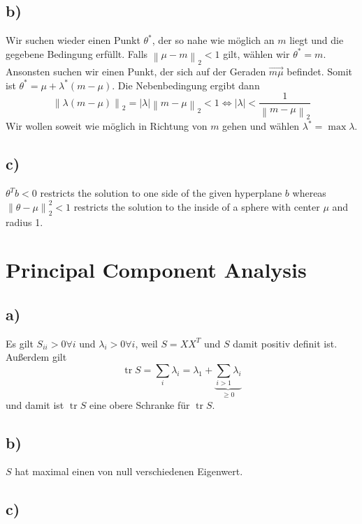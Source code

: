 \documentclass[paper=a4,fontsize=10pt,DIV11,BCOR10mm]{scrartcl}
\newcommand{\abs}[1]{\left\lvert#1\right\rvert}
\newcommand{\norm}[1]{\left\lVert#1\right\rVert}
\DeclareMathOperator{\tr}{tr}
\begin{document}
\subsection*{b)}

Wir suchen wieder einen Punkt $\theta^*$, der so nahe wie möglich an $m$ liegt und die gegebene Bedingung erfüllt. Falls $\norm{\mu - m}_2 < 1$ gilt, wählen wir $\theta^* = m$. Ansonsten suchen wir einen Punkt, der sich auf der Geraden $\overrightarrow{m \mu}$ befindet. Somit ist $\theta^* = \mu + \lambda^* (m - \mu)$. Die Nebenbedingung ergibt dann
\[ \norm{\lambda (m - \mu)}_2 = \abs{\lambda} \norm{m - \mu}_2 < 1 \Leftrightarrow \abs{\lambda} < \frac{1}{\norm{m - \mu}_2} \]
Wir wollen soweit wie möglich in Richtung von $m$ gehen und wählen $\lambda^* = \max \lambda$.



\subsection*{c)}

$\theta^T b < 0$ restricts the solution to one side of the given hyperplane $b$ whereas $\norm{\theta - \mu}_2^2 < 1$ restricts the solution to the inside of a sphere with center $\mu$ and radius 1.





\section{Principal Component Analysis}

\subsection*{a)}

Es gilt $S_{ii} > 0 \forall i$ und $\lambda_i > 0 \forall i$, weil $S = X X^T$ und $S$ damit positiv definit ist. Außerdem gilt
\[ \tr S = \sum_i \lambda_i = \lambda_1 + \underbrace{\sum_{i > 1} \lambda_i}_{\geq 0} \]
und damit ist $\tr S$ eine obere Schranke für $\tr S$.



\subsection*{b)}

$S$ hat maximal einen von null verschiedenen Eigenwert.



\subsection*{c)}
\end{document}
